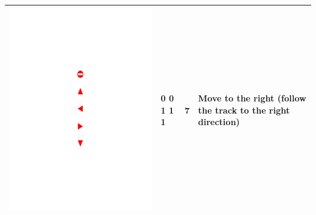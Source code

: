 \documentclass{svproc}
\begin{document}
\begin{table}[!h]
\begin{tabular}{|C{3cm}|C{1.5cm}|C{3cm}|C{4cm}|}
		\begin{minipage}{.075\textwidth}\includegraphics[scale=.5,trim=9.1cm 10.75cm 9.5cm 15.75cm,clip]{signs.pdf}\end{minipage}	& 0 0 1 1 1 & 7 & Move to the right (follow the track to the right direction) \\ \hline

\end{tabular}
\end{table}
\end{document}
